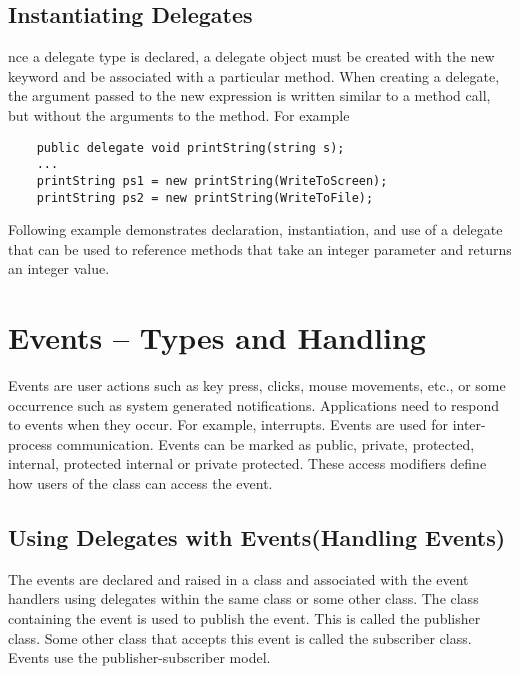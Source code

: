 \subsection*{Instantiating Delegates}
nce a delegate type is declared, a delegate object must be created with the new keyword and be
associated with a particular method. When creating a delegate, the argument passed to the new
expression is written similar to a method call, but without the arguments to the method. For
example
\begin{lstlisting}
	public delegate void printString(string s);
	...
	printString ps1 = new printString(WriteToScreen);
	printString ps2 = new printString(WriteToFile);
\end{lstlisting}

Following example demonstrates declaration, instantiation, and use of a delegate that can be used to
reference methods that take an integer parameter and returns an integer value.





\section{Events – Types and Handling}
Events are user actions such as key press, clicks, mouse movements, etc., or some occurrence such
as system generated notifications. Applications need to respond to events when they occur. For
example, interrupts. Events are used for inter-process communication. Events can be marked as
public, private, protected, internal, protected internal or private protected. These access modifiers
define how users of the class can access the event.

\subsection*{Using Delegates with Events(Handling Events)}
The events are declared and raised in a class and associated with the event handlers using delegates
within the same class or some other class. The class containing the event is used to publish the event. This is called the publisher class. Some other class that accepts this event is called the
subscriber class. Events use the publisher-subscriber model.

